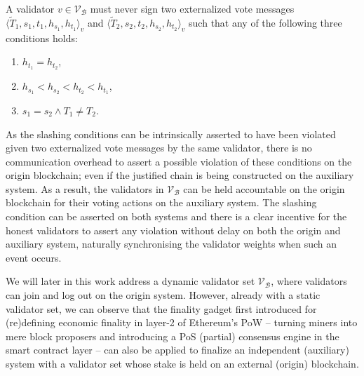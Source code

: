 \documentclass[12pt,a4paper]{article}
\begin{document}
A validator $v \in \mathcal{V}_\mathcal{B}$ must never sign two externalized vote messages $\langle \tilde{T}_1, s_1, t_1, h_{s_1}, h_{t_1}\rangle_v$ and $\langle \tilde{T}_2, s_2, t_2, h_{s_2}, h_{t_2}\rangle_v$ such that any of the following three conditions holds:
\begin{enumerate}
  \item $h_{t_1} = h_{t_2}$,
  \item $h_{s_1} < h_{s_2} < h_{t_2} < h_{t_1}$,
  \item $s_1 = s_2 \land T_1 \neq T_2$.
\end{enumerate}

As the slashing conditions can be intrinsically asserted to have been violated given two externalized vote messages by the same validator, there is no communication overhead to assert a possible violation of these conditions on the origin blockchain; even if the justified chain is being constructed on the auxiliary system.
As a result, the validators in $\mathcal{V}_\mathcal{B}$ can be held accountable on the origin blockchain for their voting actions on the auxiliary system.
The slashing condition can be asserted on both systems and there is a clear incentive for the honest validators to assert any violation without delay on both the origin and auxiliary system, naturally synchronising the validator weights when such an event occurs.

We will later in this work address a dynamic validator set $\mathcal{V}_\mathcal{B}$, where validators can join and log out on the origin system.
However, already with a static validator set, we can observe that the finality gadget first introduced for (re)defining economic finality in layer-2 of Ethereum's PoW -- turning miners into mere block proposers and introducing a PoS (partial) consensus engine in the smart contract layer -- can also be applied to finalize an independent (auxiliary) system with a validator set whose stake is held on an external (origin) blockchain.

\end{document}
